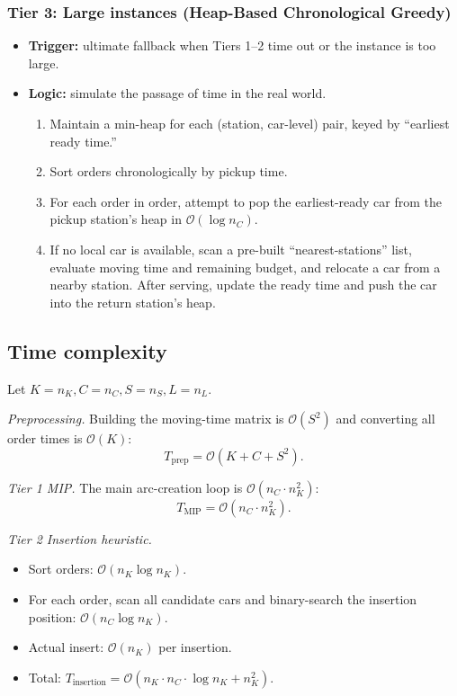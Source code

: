 \documentclass[a4paper, 12pt]{article}
\begin{document}
    \subsubsection*{Tier 3: Large instances (Heap-Based Chronological Greedy)}
    \begin{itemize}
        \item \textbf{Trigger:} ultimate fallback when Tiers 1--2 time out or the instance is too large.
        \item \textbf{Logic:} simulate the passage of time in the real world.
        \begin{enumerate}[label=\textbf{\alph*.}]
            \item Maintain a min-heap for each (station, car-level) pair, keyed by ``earliest ready time.''
            \item Sort orders chronologically by pickup time.
            \item For each order in order, attempt to pop the earliest-ready car from the pickup station's heap in $\mathcal{O}(\log n_C)$.
            \item If no local car is available, scan a pre-built ``nearest-stations'' list, evaluate moving time and remaining budget, and relocate a car from a nearby station. After serving, update the ready time and push the car into the return station's heap.
        \end{enumerate}
    \end{itemize}

    \subsection{Time complexity}

    Let $K = n_K, C = n_C, S = n_S, L = n_L$.

    \smallskip
    \noindent\textit{Preprocessing.} Building the moving-time matrix is $\mathcal{O}(S^2)$ and converting all order times is $\mathcal{O}(K)$:
    \[ T_{\text{prep}} = \mathcal{O}(K + C + S^2). \]

    \noindent\textit{Tier 1 MIP.} The main arc-creation loop is $\mathcal{O}(n_C\cdot n_K^2)$:
    \[ T_{\text{MIP}} = \mathcal{O}(n_C\cdot n_K^2). \]

    \noindent\textit{Tier 2 Insertion heuristic.}
    \begin{itemize}
        \item Sort orders: $\mathcal{O}(n_K\log n_K)$.
        \item For each order, scan all candidate cars and binary-search the insertion position: $\mathcal{O}(n_C\log n_K)$.
        \item Actual insert: $\mathcal{O}(n_K)$ per insertion.
        \item Total: $T_{\text{insertion}} = \mathcal{O}(n_K\cdot n_C\cdot \log n_K + n_K^2)$.
    \end{itemize}
\end{document}
